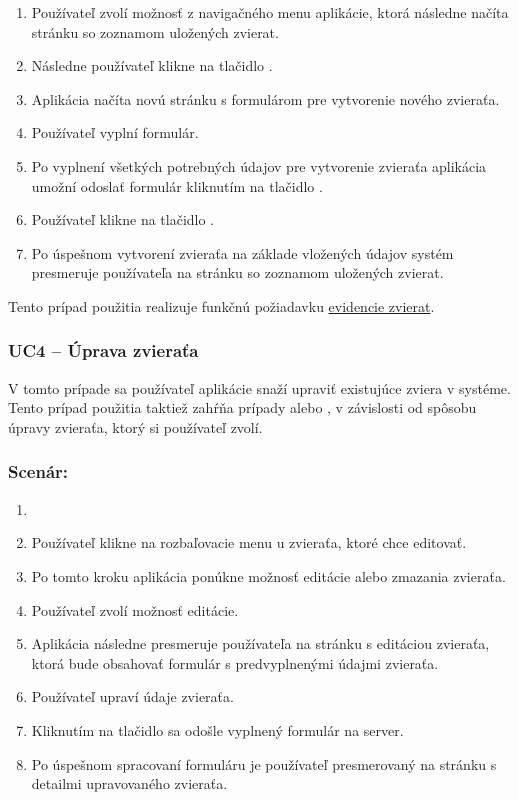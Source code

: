\begin{enumerate}
	\item Používateľ zvolí možnosť  z navigačného menu aplikácie, ktorá následne načíta stránku so zoznamom uložených zvierat.
	\item Následne používateľ klikne na tlačidlo .
	\item Aplikácia načíta novú stránku s formulárom pre vytvorenie nového zvieraťa.
	\item Používateľ vyplní formulár.
	\item Po vyplnení všetkých potrebných údajov pre vytvorenie zvieraťa aplikácia umožní odoslať formulár kliknutím na tlačidlo .
	\item Používateľ klikne na tlačidlo .
	\item Po úspešnom vytvorení zvieraťa na základe vložených údajov systém presmeruje používateľa na stránku so zoznamom uložených zvierat.
\end{enumerate}

Tento prípad použitia realizuje funkčnú požiadavku \hyperref[evidencia-zvierat]{evidencie zvierat}.

\subsubsection{UC4 -- Úprava zvieraťa}

V tomto prípade sa používateľ aplikácie snaží upraviť existujúce zviera v systéme. Tento prípad použitia taktiež zahŕňa prípady 
 alebo , v závislosti od spôsobu úpravy zvieraťa, ktorý si používateľ zvolí.

\subsubsection*{Scenár:}

\begin{enumerate}
	\item {}
	\item Používateľ klikne na rozbaľovacie menu u zvieraťa, ktoré chce editovať.
	\item Po tomto kroku aplikácia ponúkne možnosť editácie alebo zmazania zvieraťa.
	\item Používateľ zvolí možnosť editácie.
	\item Aplikácia následne presmeruje používateľa na stránku s editáciou zvieraťa, ktorá bude obsahovať formulár s predvyplnenými údajmi zvieraťa.
	\item Používateľ upraví údaje zvieraťa.
	\item Kliknutím na tlačidlo  sa odošle vyplnený formulár na server.
	\item Po úspešnom spracovaní formuláru je používateľ presmerovaný na stránku s detailmi upravovaného zvieraťa.
\end{enumerate}


